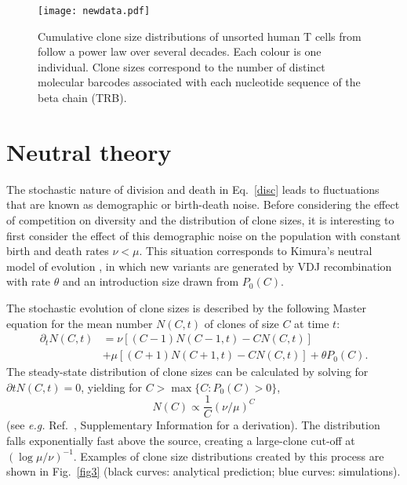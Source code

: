 \documentclass[aps,pre,twocolumn,superscriptaddress,groupedaddress]{revtex4}
\newcommand{\beq}{\begin{equation}}
\newcommand{\eeq}{\end{equation}}
\newcommand{\<}{\langle}
\renewcommand{\>}{\rangle}
\begin{document}
\begin{figure}
\begin{center}
\texttt{[image: newdata.pdf]}
\caption{Cumulative clone size distributions of unsorted human T cells from \cite{Pogorelyy2016,Mora2016e} follow a power law over several decades. Each colour is one individual. Clone sizes correspond to the number of distinct molecular barcodes associated with each nucleotide sequence of the beta chain (TRB).}
\label{fig1}
\end{center}
\end{figure}
 
 \section{Neutral theory}
 \label{neutsec}
 
The stochastic nature of division and death in Eq.~\ref{disc} leads to fluctuations that are known as demographic or birth-death noise. Before considering the effect of competition on diversity and the distribution of clone sizes, it is interesting to first consider the effect of this demographic noise on the population with constant birth and death rates $\nu<\mu$. This situation corresponds to Kimura's neutral model of evolution \cite{kimurabook}, in which new variants are generated by VDJ recombination with rate $\theta$ and an introduction size drawn from $P_0(C)$.
 
The stochastic evolution of clone sizes is described by the following Master equation for the mean number $N(C,t)$ of clones of size $C$ at time $t$:
\beq
\begin{split}
\partial_t N(C,t) &=  \nu[(C-1) N(C-1,t) -C N(C,t)] \\
&+ \mu [(C+1) N(C+1,t)-CN(C,t)] + \theta P_0(C).
\end{split}
\eeq
The steady-state distribution of clone sizes can be calculated by solving for $\partial t N(C,t)=0$, yielding for $C>\max\{C: P_0(C)>0\}$,
\beq
N(C) \propto \frac{1}{C}(\nu/\mu)^{C}
\label{neutsol}
\eeq
(see {\em e.g.} Ref.~\cite{desponds2016}, Supplementary Information for a derivation). The distribution falls exponentially fast above the source, creating a large-clone cut-off at $ (\log{\mu/\nu})^{-1}$. Examples of clone size distributions created by this process are shown in Fig.~\ref{fig3} (black curves: analytical prediction; blue curves: simulations).
 
\end{document}
